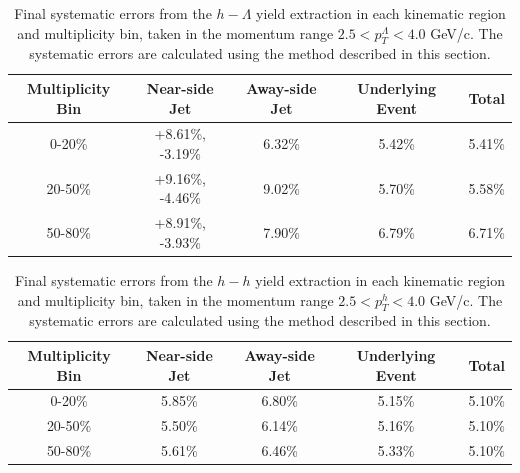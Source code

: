 \documentclass[ALICE,manyauthors]{ALICE_analysis_notes}
\begin{document}
\begin{table}[h!]
\centering
\begin{tabular}{| c | c | c | c | c | }
\hline
Multiplicity Bin & Near-side Jet & Away-side Jet & Underlying Event & Total  \\
\hline
0-20\% & +8.61\%, -3.19\% & 6.32\%  & 5.42\% & 5.41\% \\
20-50\% & +9.16\%, -4.46\%  & 9.02\%  & 5.70\% & 5.58\% \\
50-80\% & +8.91\%, -3.93\%  & 7.90\%  & 6.79\% & 6.71\% \\
\hline
\end{tabular}
\caption{Final systematic errors from the $h-\Lambda$ yield extraction in each kinematic region and multiplicity bin, taken in the momentum range $2.5 < p_{T}^{\Lambda} < 4.0$ GeV/c. The systematic errors are calculated using the method described in this section.}
\label{h_lambda_yield_extraction_systematics_highpt}
\end{table}

\begin{table}[h!]
\centering
\begin{tabular}{| c | c | c | c | c | }
\hline
Multiplicity Bin & Near-side Jet & Away-side Jet & Underlying Event & Total  \\
\hline
0-20\% & 5.85\%   & 6.80\%  & 5.15\% & 5.10\% \\
20-50\% & 5.50\% & 6.14\%  & 5.16\% & 5.10\% \\
50-80\% & 5.61\% & 6.46\%  & 5.33\% & 5.10\% \\
\hline
\end{tabular}
\caption{Final systematic errors from the $h-h$ yield extraction in each kinematic region and multiplicity bin, taken in the momentum range $2.5 < p_{T}^{h} < 4.0$ GeV/c. The systematic errors are calculated using the method described in this section.}
\label{h_h_yield_extraction_systematics_highpt}
\end{table}






\end{document}
